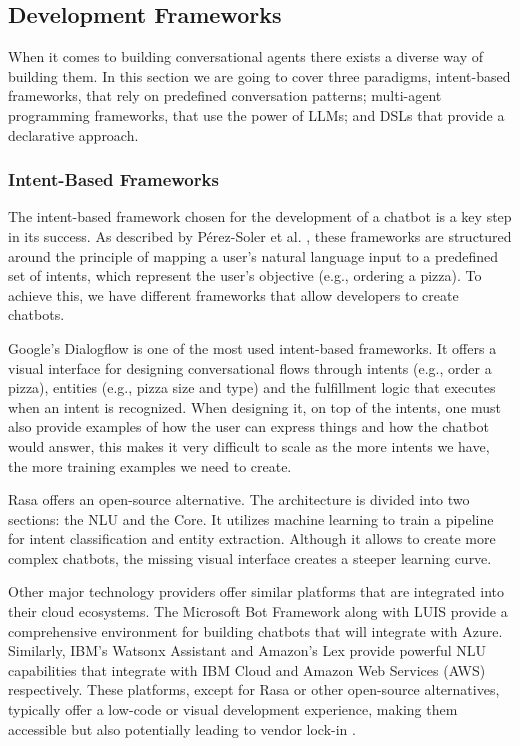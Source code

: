 \subsection{Development Frameworks}

When it comes to building conversational agents
there exists a diverse way of building them.
In this section we are going to cover three paradigms,
intent-based frameworks, that rely on predefined conversation patterns;
multi-agent programming frameworks, that use the power of \acp{LLM};
and \aclp{DSL} that provide a declarative approach.

\subsubsection{Intent-Based Frameworks}

The intent-based framework chosen for the development of a chatbot
is a key step in its success.
As described by Pérez-Soler et al. \autocite{perez-solerChoosingChatbotDevelopment2021},
these frameworks are structured around the principle of
mapping a user's natural language input
to a predefined set of intents,
which represent the user's objective (e.g., ordering a pizza).
To achieve this, we have different frameworks
that allow developers to create chatbots.

Google's Dialogflow \autocite{Dialogflow}
is one of the most used intent-based frameworks.
It offers a visual interface
for designing conversational flows
through intents (e.g., order a pizza),
entities (e.g., pizza size and type)
and the fulfillment logic that executes when an intent is recognized.
When designing it, on top of the intents,
one must also provide examples of how the user can express things
and how the chatbot would answer,
this makes it very difficult to scale
as the more intents we have,
the more training examples we need to create.

Rasa \autocite{Rasa2020} offers an open-source \autocite{RasaHQRasa2025} alternative.
The architecture is divided into two sections:
the \ac{NLU} and the Core.
It utilizes machine learning to train a pipeline
for intent classification and entity extraction.
Although it allows to create more complex chatbots,
the missing visual interface creates a steeper learning curve.

Other major technology providers offer similar platforms
that are integrated into their cloud ecosystems.
The Microsoft Bot Framework \autocite{MicrosoftBotFramework}
along with \ac{LUIS} \autocite{LUISLanguageUnderstanding}
provide a comprehensive environment
for building chatbots that will integrate with Azure.
Similarly, IBM's Watsonx Assistant \autocite{IBMWatsonxAssistant2025}
and Amazon's Lex \autocite{AmazonLex}
provide powerful \ac{NLU} capabilities that integrate
with IBM Cloud and Amazon Web Services (AWS) respectively.
These platforms, except for Rasa or other open-source alternatives,
typically offer a low-code or visual development experience,
making them accessible but also potentially leading to vendor lock-in \autocite{perez-solerChoosingChatbotDevelopment2021}.


